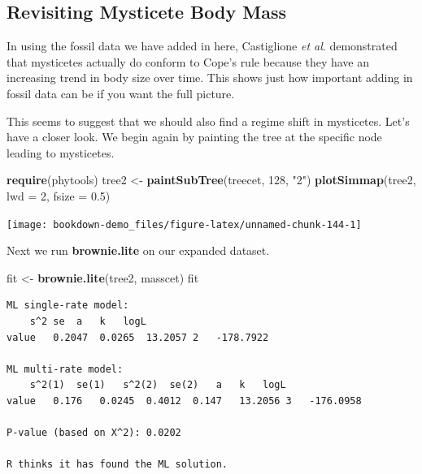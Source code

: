 \documentclass[
]{book}
\newenvironment{Shaded}{\begin{snugshade}}{\end{snugshade}}
\newcommand{\DataTypeTok}[1]{\textcolor[rgb]{0.13,0.29,0.53}{#1}}
\newcommand{\DecValTok}[1]{\textcolor[rgb]{0.00,0.00,0.81}{#1}}
\newcommand{\FloatTok}[1]{\textcolor[rgb]{0.00,0.00,0.81}{#1}}
\newcommand{\KeywordTok}[1]{\textcolor[rgb]{0.13,0.29,0.53}{\textbf{#1}}}
\newcommand{\NormalTok}[1]{#1}
\newcommand{\StringTok}[1]{\textcolor[rgb]{0.31,0.60,0.02}{#1}}
\begin{document}
\hypertarget{revisiting-mysticete-body-mass}{%
\subsection{Revisiting Mysticete Body Mass}\label{revisiting-mysticete-body-mass}}

In using the fossil data we have added in here, Castiglione \emph{et al}. \citeyearpar{Castiglione20} demonstrated that mysticetes actually do conform to Cope's rule because they have an increasing trend in body size over time. This shows just how important adding in fossil data can be if you want the full picture.

This seems to suggest that we should also find a regime shift in mysticetes. Let's have a closer look. We begin again by painting the tree at the specific node leading to mysticetes.

\begin{Shaded}
\begin{Highlighting}[]
\KeywordTok{require}\NormalTok{(phytools)}
\NormalTok{tree2 \textless{}{-}}\StringTok{ }\KeywordTok{paintSubTree}\NormalTok{(treecet, }\DecValTok{128}\NormalTok{, }\StringTok{"2"}\NormalTok{)}
\KeywordTok{plotSimmap}\NormalTok{(tree2, }\DataTypeTok{lwd =} \DecValTok{2}\NormalTok{, }\DataTypeTok{fsize =} \FloatTok{0.5}\NormalTok{)}
\end{Highlighting}
\end{Shaded}

\begin{center}\texttt{[image: bookdown-demo\_files/figure-latex/unnamed-chunk-144-1]} \end{center}

Next we run \textbf{brownie.lite} on our expanded dataset.

\begin{Shaded}
\begin{Highlighting}[]
\NormalTok{fit \textless{}{-}}\StringTok{ }\KeywordTok{brownie.lite}\NormalTok{(tree2, masscet)}
\NormalTok{fit}
\end{Highlighting}
\end{Shaded}

\begin{verbatim}
ML single-rate model:
    s^2 se  a   k   logL
value   0.2047  0.0265  13.2057 2   -178.7922   

ML multi-rate model:
    s^2(1)  se(1)   s^2(2)  se(2)   a   k   logL    
value   0.176   0.0245  0.4012  0.147   13.2056 3   -176.0958

P-value (based on X^2): 0.0202 

R thinks it has found the ML solution.
\end{verbatim}
\end{document}
